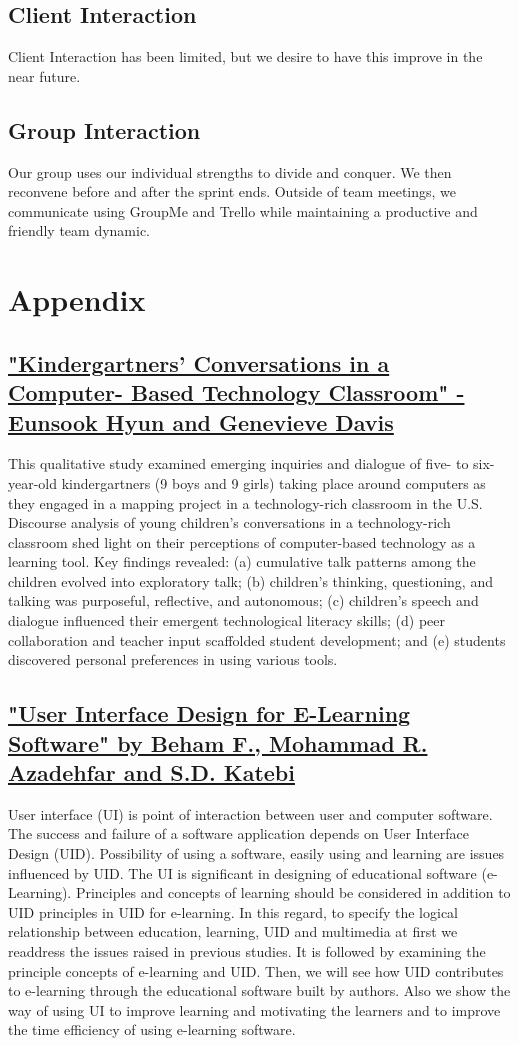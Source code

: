 \documentclass[sigchi]{acmart}
\begin{document}
		\subsection{Client Interaction}
			Client Interaction has been limited, but we desire to have this improve in the near future.
		\subsection{Group Interaction}
			Our group uses our individual strengths to divide and conquer. We then reconvene before and after the sprint ends. Outside of team meetings, we communicate using GroupMe and Trello while maintaining a productive and friendly team dynamic.
	\section{Appendix}
		\subsection{\href{https://doi.org/10.1080/03634520500213397}{"Kindergartners' Conversations in a Computer- Based Technology Classroom" - Eunsook Hyun and Genevieve Davis}}
			This qualitative study examined emerging inquiries and dialogue of five- to six-year-old kindergartners (9 boys and 9 girls) taking place around computers as they engaged in a mapping project in a technology-rich classroom in the U.S. Discourse analysis of young children's conversations in a technology-rich classroom shed light on their perceptions of computer-based technology as a learning tool. Key findings revealed: (a) cumulative talk patterns among the children evolved into exploratory talk; (b) children's thinking, questioning, and talking was purposeful, reflective, and autonomous; (c) children's speech and dialogue influenced their emergent technological literacy skills; (d) peer collaboration and teacher input scaffolded student development; and (e) students discovered personal preferences in using various tools.
		\subsection{\href{https://arxiv.org/ftp/arxiv/papers/1401/1401.6365.pdf}{"User Interface Design for E-Learning Software" by Beham F., Mohammad R. Azadehfar and S.D. Katebi}}
			User interface (UI) is point of interaction between user and computer software. The success and failure of a software application depends on User Interface Design (UID). Possibility of using a software, easily using and learning are issues influenced by UID. The UI is significant in designing of educational software (e-Learning). Principles and concepts of learning should be considered in addition to UID principles in UID for e-learning. In this regard, to specify the logical relationship between education, learning, UID and multimedia at first we readdress the issues raised in previous studies. It is followed by examining the principle concepts of e-learning and UID. Then, we will see how UID contributes to e-learning through the educational software built by authors. Also we show the way of using UI to improve learning and motivating the learners and to improve the time efficiency of using e-learning software.
\end{document}
